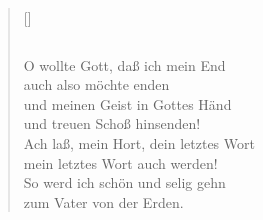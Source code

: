 \begin{center}
\settowidth{\versewidth}{Der, vor dem die Welt erschrickt,}
\begin{verse}[\versewidth]
\begin{verbatim}

\end{verbatim}

 O wollte Gott, daß ich mein End\\
auch also möchte enden\\
und meinen Geist in Gottes Händ\\
und treuen Schoß hinsenden!\\
Ach laß, mein Hort, dein letztes Wort\\
mein letztes Wort auch werden!\\
So werd ich schön und selig gehn\\
zum Vater von der Erden.
  
  
\end{verse}
\end{center}




